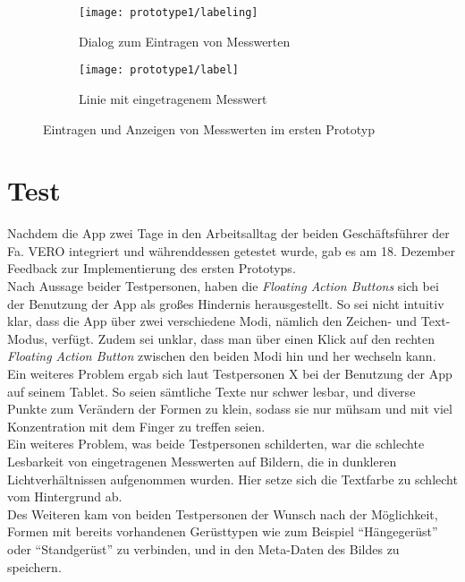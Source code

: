 \begin{figure}[h]
  \begin{subfigure}[t]{0.4\textwidth}
    \texttt{[image: prototype1/labeling]}
    \caption{Dialog zum Eintragen von Messwerten}
    \label{fig:labeling1}
  \end{subfigure}
  \begin{subfigure}[t]{0.4\textwidth}
    \texttt{[image: prototype1/label]}
    \caption{Linie mit eingetragenem Messwert}
    \label{fig:label1}
  \end{subfigure}
  \centering
  \caption{Eintragen und Anzeigen von Messwerten im ersten Prototyp}
\end{figure}

\section{Test}\label{sec:test1}
Nachdem die App zwei Tage in den Arbeitsalltag der beiden Geschäftsführer der Fa. VERO integriert und währenddessen getestet wurde, gab es am 18. Dezember Feedback zur Implementierung des ersten Prototyps. \\

Nach Aussage beider Testpersonen, haben die \emph{Floating Action Buttons} sich bei der Benutzung der App als großes Hindernis herausgestellt.
So sei nicht intuitiv klar, dass die App über zwei verschiedene Modi, nämlich den Zeichen- und Text-Modus, verfügt.
Zudem sei unklar, dass man über einen Klick auf den rechten \emph{Floating Action Button} zwischen den beiden Modi hin und her wechseln kann. \\

Ein weiteres Problem ergab sich laut Testpersonen X  bei der Benutzung der App auf seinem Tablet.
So seien sämtliche Texte nur schwer lesbar, und diverse Punkte zum Verändern der Formen zu klein, sodass sie nur mühsam und mit viel Konzentration mit dem Finger zu treffen seien. \\

Ein weiteres Problem, was beide Testpersonen schilderten, war die schlechte Lesbarkeit von eingetragenen Messwerten auf Bildern, die in dunkleren Lichtverhältnissen aufgenommen wurden.
Hier setze sich die Textfarbe zu schlecht vom Hintergrund ab. \\

Des Weiteren kam von beiden Testpersonen der Wunsch nach der Möglichkeit, Formen mit bereits vorhandenen Gerüsttypen wie zum Beispiel ``Hängegerüst'' oder ``Standgerüst'' zu verbinden, und in den Meta-Daten des Bildes zu speichern. \\

